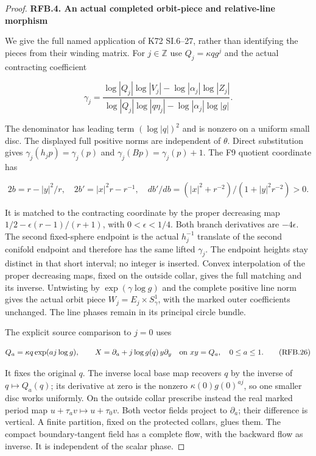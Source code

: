 \begin{proof}
\par

\medskip\noindent\textbf{RFB.4. An actual completed orbit-piece and relative-line morphism}

\par\nobreak

We give the full named application of K72 SI.6--27, rather than
identifying the pieces from their winding matrix. For \(j\in\mathbb Z\)
use \(Q_j=\kappa qg^j\) and the actual contracting coefficient

\[
 \gamma_j=
 \frac{\log|Q_j|\log|V_j|-\log|\alpha_j|\log|Z_j|}
 {\log|Q_j|\log|q\eta_j|-\log|\alpha_j|\log|g|}.
 \tag{RFB.24}
\]

The denominator has leading term \((\log|q|)^2\) and is nonzero
on a uniform small disc. The displayed full positive norms are
independent of \(\theta\). Direct substitution gives
\(\gamma_j(h_jp)=\gamma_j(p)\) and
\(\gamma_j(Bp)=\gamma_j(p)+1\). The F9 quotient coordinate has

\[
 2b=r-|y|^2/r,\quad2b'=|x|^2r-r^{-1},\quad
 db'/db=(|x|^2+r^{-2})/(1+|y|^2r^{-2})>0.
 \tag{RFB.25}
\]

It is matched to the contracting coordinate by the proper decreasing
map \(1/2-\epsilon(r-1)/(r+1)\), with \(0<\epsilon<1/4\).
Both branch derivatives are \(-4\epsilon\). The second fixed-sphere
endpoint is the actual \(h_j^{-1}\) translate of the second
conifold endpoint and therefore has the same lifted \(\gamma_j\).
The endpoint heights stay distinct in that short interval; no
integer is inserted. Convex interpolation of the proper decreasing
maps, fixed on the outside collar, gives the full matching and its
inverse. Untwisting by \(\exp(\gamma\log g)\) and the complete
positive line norm gives the actual orbit piece
\(W_j=E_j\times S^1_\gamma\), with the marked outer coefficients
unchanged. The line phases remain in its principal circle bundle.

The explicit source comparison to \(j=0\) uses

\[
 Q_{a}=\kappa q\exp(aj\log g),\qquad
 X=\partial_a+j\log g(q)\,y\partial_y
          \quad\hbox{on }xy=Q_a,\quad0\le a\le1.
 \tag{RFB.26}
\]

It fixes the original \(q\). The inverse local base map recovers
\(q\) by the inverse of \(q\mapsto Q_a(q)\); its derivative at zero
is the nonzero \(\kappa(0)g(0)^{aj}\), so one smaller disc works
uniformly. On the outside collar prescribe instead the real marked
period map \(u+\tau_av\mapsto u+\tau_0v\). Both vector fields
project to \(\partial_a\); their difference is vertical. A finite
partition, fixed on the protected collars, glues them. The compact
boundary-tangent field has a complete flow, with the backward flow
as inverse. It is independent of the scalar phase.


\end{proof}
